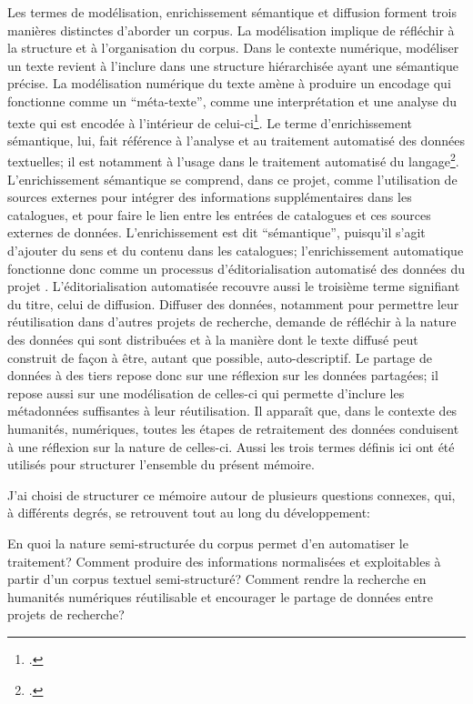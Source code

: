 Les termes de modélisation, enrichissement sémantique et diffusion forment trois manières distinctes d'aborder un corpus. La modélisation implique de réfléchir à la structure et à l'organisation du corpus. Dans le contexte numérique, modéliser un texte revient à l'inclure dans une structure hiérarchisée ayant une sémantique précise. La modélisation numérique du texte amène à produire un encodage qui fonctionne comme un \enquote{méta-texte}, comme une interprétation et une analyse du texte qui est encodée à l'intérieur de celui-ci\footcite[p. 27]{flanders_gentle_2019}. Le terme d'enrichissement sémantique, lui, fait référence à l'analyse et au traitement automatisé des données textuelles; il est notamment à l'usage dans le traitement automatisé du langage\footcite{brando_evaluation_2016}. L'enrichissement sémantique se comprend, dans ce projet, comme l'utilisation de sources externes pour intégrer des informations supplémentaires dans les catalogues, et pour faire le lien entre les entrées de catalogues et ces sources externes de données. L'enrichissement est dit \enquote{sémantique}, puisqu'il s'agit d'ajouter du sens et du contenu dans les catalogues; l'enrichissement automatique fonctionne donc comme un processus d'éditorialisation automatisé des données du projet \mssktb{}. L'éditorialisation automatisée recouvre aussi le troisième terme signifiant du titre, celui de diffusion. Diffuser des données, notamment pour permettre leur réutilisation dans d'autres projets de recherche, demande de réfléchir à la nature des données qui sont distribuées et à la manière dont le texte diffusé peut construit de façon à être, autant que possible, auto-descriptif. Le partage de données à des tiers repose donc sur une réflexion sur les données partagées; il repose aussi sur une modélisation de celles-ci qui permette d'inclure les métadonnées suffisantes à leur réutilisation. Il apparaît que, dans le contexte des humanités, numériques, toutes les étapes de retraitement des données conduisent à une réflexion sur la nature de celles-ci. Aussi les trois termes définis ici ont été utilisés pour structurer l'ensemble du présent mémoire.

J'ai choisi de structurer ce mémoire autour de plusieurs questions connexes, qui, à différents degrés, se retrouvent tout au long du développement:

\begin{adjustwidth}{60pt}{60pt}
	En quoi la nature semi-structurée du corpus permet d'en automatiser le traitement? Comment produire des informations normalisées et exploitables à partir d'un corpus textuel semi-structuré? Comment rendre la recherche en humanités numériques réutilisable et encourager le partage de données entre projets de recherche?
\end{adjustwidth}

